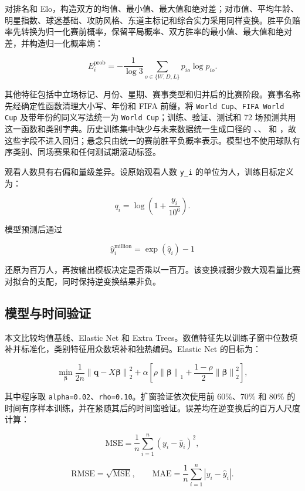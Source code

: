 对排名和 Elo，构造双方的均值、最小值、最大值和绝对差；对市值、平均年龄、明星指数、球迷基础、攻防风格、东道主标记和综合实力采用同样变换。胜平负赔率先转换为归一化赛前概率，保留平局概率、双方胜率的最小值、最大值和绝对差，并构造归一化概率熵：

\[
E_i^{\mathrm{prob}}=-\frac{1}{\log 3}
\sum_{o\in\{W,D,L\}}p_{io}\log p_{io}.
\]

其他特征包括中立场标记、月份、星期、赛事类型和归并后的比赛阶段。赛事名称先经确定性函数清理大小写、年份和 FIFA 前缀，将 \texttt{World Cup}、\texttt{FIFA World Cup} 及带年份的同义写法统一为 \texttt{World Cup}；训练、验证、测试和 72 场预测共用这一函数和类别字典。历史训练集中缺少与未来数据统一生成口径的 、、 和 ，故这些字段不进入回归；悬念只由统一的赛前胜平负概率表示。模型也不使用球队有序类别、同场赛果和任何测试期滚动标签。

观看人数具有右偏和量级差异。设原始观看人数 \texttt{y\_i} 的单位为人，训练目标定义为：

\[
q_i=\log\left(1+\frac{y_i}{10^6}\right).
\]

模型预测后通过

\[
\widehat y_i^{\mathrm{million}}=\exp(\widehat q_i)-1
\]

还原为百万人，再按输出模板决定是否乘以一百万。该变换减弱少数大观看量比赛对拟合的支配，同时保持逆变换结果非负。

\subsection{模型与时间验证}

本文比较均值基线、Elastic Net 和 Extra Trees\cite{zou2005,geurts2006}。数值特征先以训练子窗中位数填补并标准化，类别特征用众数填补和独热编码。Elastic Net 的目标为：

\[
\min_{\boldsymbol\beta}
\frac{1}{2n}\left\|\boldsymbol q-X\boldsymbol\beta\right\|_2^2
+\alpha\left[
\rho\left\|\boldsymbol\beta\right\|_1
+\frac{1-\rho}{2}\left\|\boldsymbol\beta\right\|_2^2
\right],
\]

其中程序取 \texttt{alpha=0.02}、\texttt{rho=0.10}。扩窗验证依次使用前 60\%、70\% 和 80\% 的时间有序样本训练，并在紧随其后的时间窗验证。误差均在逆变换后的百万人尺度计算：

\[
\mathrm{MSE}=\frac{1}{n}\sum_{i=1}^{n}(y_i-\widehat y_i)^2,
\]

\[
\mathrm{RMSE}=\sqrt{\mathrm{MSE}},\qquad
\mathrm{MAE}=\frac{1}{n}\sum_{i=1}^{n}|y_i-\widehat y_i|.
\]

